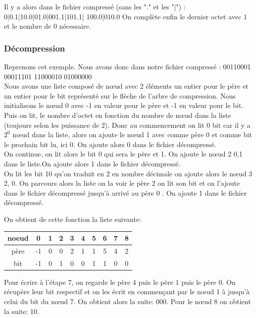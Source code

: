 \documentclass{report}
\begin{document}
Il y a alors dans le fichier compressé (sans les "." et les "|") :\\ 
0|0.1|10.0|01.0|001.1|101.1| 100.0|010.0 
On complète enfin le dernier octet avec 1 et le nombre de 0 nécessaire. 

\subsubsection{Décompression}
Reprenons cet exemple. 
Nous avons donc dans notre fichier compressé :
00110001 00011101 11000010 01000000 \\
Nous avons une liste composé de nœud avec 2 éléments un entier pour le père et un entier pour le bit représenté sur le flèche de l'arbre de compression. Nous initialisons le nœud 0 avec -1 en valeur pour le père et -1 en valeur pour le bit. 
Puis on lit, le nombre d'octet en fonction du nombre de nœud dans la liste (toujours selon les puissance de 2).
Donc au commencement on lit 0 bit car il y a $2^{0}$ nœud dans la liste, alors on ajoute le nœud 1 avec comme père 0 et comme bit le prochain bit lu, ici 0.
On ajoute alors 0 dans le fichier décompressé. \\
On continue, on lit alors le bit 0 qui sera le père et 1. On ajoute le nœud 2 {0,1} 
dans le liste.On ajoute alors 1 dans le fichier décompressé.\\
On lit les bit 10 qu'on traduit en 2 en nombre décimale on ajoute alors le nœud 3 {2, 0}. On parcours alors la liste on la voir le père 2 on lit son bit et on l'ajoute dans le fichier décompressé jusqu'à arrivé au père 0 . On ajoute 1 dans le fichier décompressé. 

On obtient de cette fonction la liste suivante:
\begin{center}
\begin{tabular}{|c|c|c|c|c|c|c|c|c|c|}
\hline
noeud & 0 & 1 & 2 & 3 & 4 & 5 & 6 & 7 & 8 \\
\hline
père & -1 & 0 & 0 & 2 & 1 & 1 & 5 & 4 & 2\\
\hline
bit & -1 & 0 & 1 & 0 & 0 & 1 & 1 & 0 & 0 \\
\hline 
\end{tabular}
\end{center}
 
Pour écrire à l'étape 7, on regarde le père 4 puis le père 1 puis le père 0. 
On récupère leur bit respectif et on les écrit en commençant par le nœud  1 à jusqu'à celui du bit du nœud 7. On obtient alors la suite: 000.
Pour le nœud 8 on obtient la suite: 10. 
\end{document}
